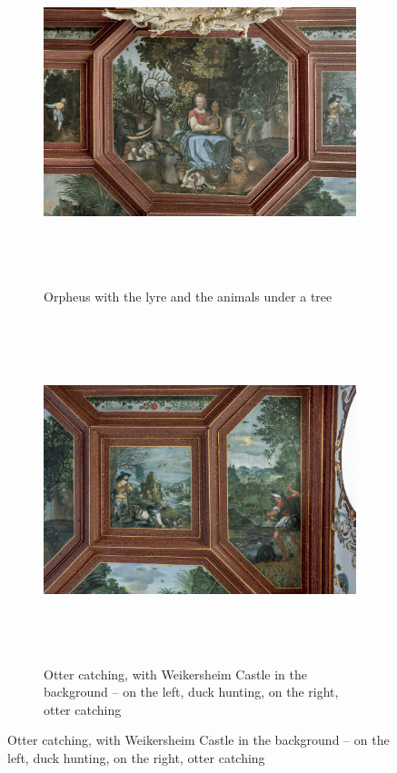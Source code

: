 \documentclass[
  a4paper,
]{book}
\begin{document}
\begin{figure}
\begin{figure}[H]    
  \includegraphics[height=10cm]{images/fmd10024323a.jpg}
  \caption{Orpheus with the lyre and the animals under a tree}
  \label{fig:{images/fmd10024323a.jpg}}
\end{figure}

\clearpage

\begin{figure}[H]    
  \includegraphics[height=10cm]{images/fmd10024324a.jpg}
  \caption{Otter catching, with Weikersheim Castle in the background – on the left, duck hunting, on the right, otter catching}
  \label{fig:{images/fmd10024324a.jpg}}
\end{figure}


\end{figure}
\end{document}
